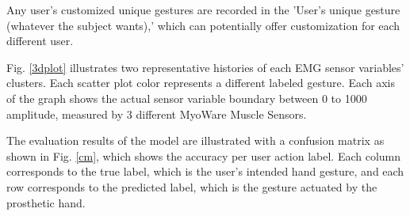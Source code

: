 



Any user's customized unique gestures are recorded in the 'User's
unique gesture (whatever the subject wants),' which can potentially
offer customization for each different user.

Fig. \ref{3dplot} illustrates two representative histories of each EMG
sensor variables' clusters. Each scatter plot color represents a
different labeled gesture. Each axis of the graph shows the actual
sensor variable boundary between 0 to 1000 amplitude, measured by 3
different MyoWare Muscle Sensors.




The evaluation results of the model are illustrated with a confusion
matrix as shown in Fig. \ref{cm}, which shows the accuracy per user
action label. Each column corresponds to the true label, which is the
user's intended hand gesture, and each row corresponds to the predicted
label, which is the gesture actuated by the prosthetic hand.

